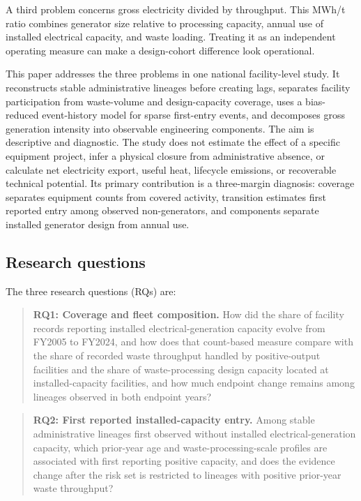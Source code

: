 \documentclass[11pt,letterpaper]{article}
\begin{document}
A third problem concerns gross electricity divided by throughput. This MWh/t
ratio combines generator size relative to processing capacity, annual use of
installed electrical capacity, and waste loading. Treating it as an independent
operating measure can make a design-cohort difference look operational.

This paper addresses the three problems in one national facility-level study.
It reconstructs stable administrative lineages before creating lags, separates
facility participation from waste-volume and design-capacity coverage, uses a
bias-reduced event-history model for sparse first-entry events, and decomposes
gross generation intensity into observable engineering components. The aim is
descriptive and diagnostic. The study does not estimate the effect of a
specific equipment project, infer a physical closure from administrative
absence, or calculate net electricity export, useful heat, lifecycle emissions,
or recoverable technical potential. Its primary contribution is a three-margin
diagnosis: coverage separates equipment counts from covered activity, transition
estimates first reported entry among observed non-generators, and components
separate installed generator design from annual use.

\subsection{Research questions}

The three research questions (RQs) are:

\begin{quote}
\textbf{RQ1: Coverage and fleet composition.} How did the share of facility
records reporting installed electrical-generation capacity evolve from FY2005
to FY2024, and how does that count-based measure compare with the share of
recorded waste throughput handled by positive-output facilities and the share
of waste-processing design capacity located at installed-capacity facilities,
and how much endpoint change remains among lineages observed in both endpoint
years?
\end{quote}

\begin{quote}
\textbf{RQ2: First reported installed-capacity entry.} Among stable
administrative lineages first observed without installed electrical-generation
capacity, which prior-year age and waste-processing-scale profiles are
associated with first reporting positive capacity, and does the evidence change
after the risk set is restricted to lineages with positive prior-year waste
throughput?
\end{quote}
\end{document}
